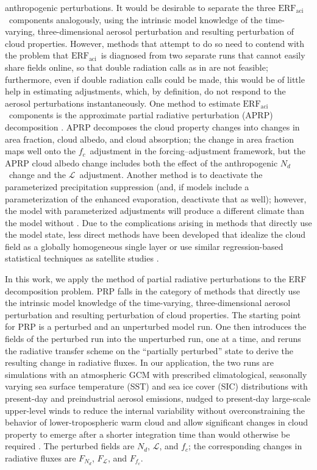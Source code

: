 \documentclass[acp, manuscript]{copernicus}\usepackage[]{graphicx}\usepackage[]{color}
\newcommand\nd{\ensuremath{N_d}}
\newcommand\lwp{\ensuremath{\mathcal L}}
\newcommand\fc{\ensuremath{f_c}}
\newcommand\cf{\fc}
\newcommand\erfaci{\ensuremath{\text{ERF}_\text{aci}}}
\begin{document}
anthropogenic perturbations.  It would be desirable to separate the three
\erfaci\ components analogously, using the intrinsic model knowledge of the time-varying, three-dimensional
aerosol perturbation and resulting perturbation of cloud properties.  However, 
methods that attempt to do so
need to
contend with the problem that \erfaci\ is diagnosed from two separate runs
that cannot easily share fields online, so that double radiation calls as in
\citet{Ghan2013} are not feasible; furthermore, even if double radiation calls
could be made, this would be of little help in estimating adjustments, which, by
definition, do not respond to the aerosol perturbations instantaneously.  One
method to estimate \erfaci\ components is the approximate partial radiative
perturbation (APRP) decomposition \citep{Taylor2007,Zelinka2014}.  APRP
decomposes the cloud property changes into changes in area fraction, cloud
albedo, and cloud absorption; the change in area fraction maps well onto the
\cf\ adjustment in the forcing--adjustment framework, but the APRP cloud albedo
change includes both the effect of the anthropogenic \nd\ change and the \lwp\
adjustment.  Another method is to deactivate the parameterized
precipitation suppression (and, if models include a parameterization of the
enhanced evaporation, deactivate that as well); however, the model with
parameterized adjustments will produce a different climate than the model
without \citep{Penner2006}.  Due to the complications arising in methods that
directly use the model state, less direct methods have been developed that
idealize the cloud field as a globally homogeneous single layer \citep{Ghan2016}
or use similar regression-based statistical techniques as satellite studies
\citep{Gryspeerdt2019b}.

In this work, we apply the method of partial radiative perturbations
\citep[PRP;][]{Wetherald1988,Colman1997,Colman2003,Klocke2013} to the ERF
decomposition problem.  PRP falls in the category of methods that
directly use the intrinsic model knowledge of the time-varying,
three-dimensional aerosol perturbation and resulting perturbation of cloud
properties.  The starting point for PRP is a
perturbed and an unperturbed model run.  One then introduces the fields of the
perturbed run into the unperturbed run, one at a time, and reruns the radiative
transfer scheme on the ``partially perturbed'' state to derive the resulting
change in radiative fluxes.  In our application, the two runs are
simulations with an atmospheric GCM with prescribed climatological,
seasonally varying sea surface temperature (SST) and sea ice cover (SIC) distributions
with present-day and preindustrial aerosol emissions, nudged to 
present-day large-scale upper-level winds to reduce the internal variability
without overconstraining the behavior of lower-tropospheric warm cloud and allow
significant changes in cloud property to emerge after a shorter integration time
than would otherwise be required \citep[e.g.,][]{Kooperman2012,Zhang2014}.  The perturbed fields are \nd, \lwp, and \cf;
the corresponding changes in radiative fluxes are $F_{\nd}$, $F_\lwp$, and
$F_{\cf}$.  
\end{document}
